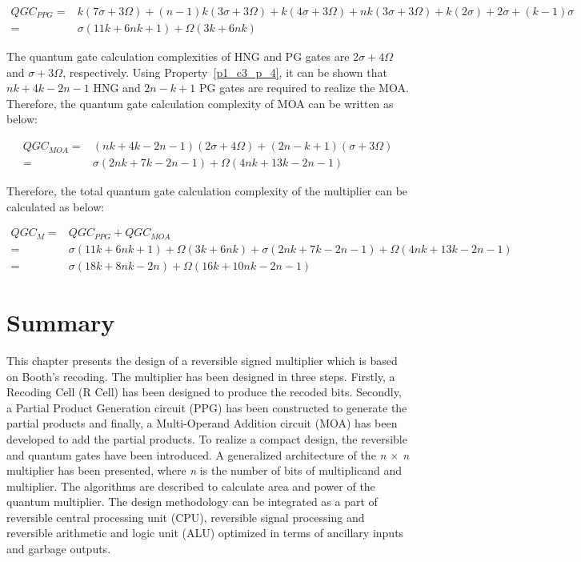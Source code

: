 \begin{align*}
 QGC_{PPG}=& k(7\sigma + 3\Omega) + (n-1) k(3\sigma+ 3\Omega) + k(4\sigma+ 3\Omega) + nk(3\sigma+ 3\Omega) + k(2\sigma) + 2\sigma + (k-1)\sigma\\
=&\sigma (11k + 6nk + 1)+\Omega (3k + 6nk)	
\end{align*}

\noindent The quantum gate calculation complexities of HNG and PG gates are $2\sigma+4\Omega$ and $\sigma+3\Omega$, respectively. Using Property~\ref{p1_c3_p_4}, it can be shown that $nk+4k-2n-1$ HNG and $2n-k+1$ PG gates are required to realize the MOA. Therefore, the quantum gate calculation complexity of MOA can be written as below:

\begin{align*}
QGC_{MOA} =& (nk+4k - 2n - 1)( 2\sigma+ 4\Omega) + (2n - k + 1)(\sigma+3\Omega)\\	
=&  \sigma (2nk + 7k - 2n - 1) + \Omega (4nk + 13k - 2n - 1)	
\end{align*}

\noindent Therefore\textit{, }the total quantum gate calculation complexity of the multiplier can be calculated as below:

\begin{align*}
QGC_{M} =& QGC_{PPG} + QGC_{MOA}\\	
=& \sigma (11k+6nk+1)+\Omega (3k+6nk)+\sigma (2nk+7k-2n-1) + \Omega (4nk+13k-2n-1)\\	
=& \sigma (18k + 8nk - 2n)+\Omega (16k + 10nk - 2n - 1)
\end{align*}
	
	\section{Summary}
	This chapter presents the design of a reversible signed multiplier which is based on Booth's recoding. The multiplier has been designed in three steps. Firstly, a Recoding Cell (R Cell) has been designed to produce the recoded bits. Secondly, a Partial Product Generation circuit (PPG) has been constructed to generate the partial products and finally, a Multi-Operand Addition circuit (MOA) has been developed to add the partial products. To realize a compact design, the reversible and quantum gates have been introduced. A generalized architecture of the \textit{n $\times$ n} multiplier has been presented, where \textit{n} is the number of bits of multiplicand and multiplier. The algorithms are described to calculate area and power of the quantum multiplier. The design methodology can be integrated as a part of reversible central processing unit (CPU), reversible signal processing and reversible arithmetic and logic unit (ALU) optimized in terms of ancillary inputs and garbage outputs.
	

